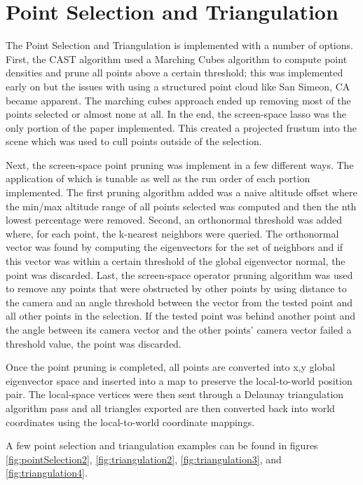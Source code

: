 \section{Point Selection and Triangulation}

The Point Selection and Triangulation is implemented with a number of options.
First, the CAST algorithm used a Marching Cubes algorithm to compute point
densities and prune all points above a certain threshold; this was implemented
early on but the issues with using a structured point cloud like San Simeon, CA
became apparent. The marching cubes approach ended up removing most of the
points selected or almost none at all. In the end, the screen-space lasso was
the only portion of the paper implemented. This created a projected frustum into
the scene which was used to cull points outside of the selection.

Next, the screen-space point pruning was implement in a few different ways. The
application of which is tunable as well as the run order of each portion
implemented. The first pruning algorithm added was a naive altitude offset where
the min/max altitude range of all points selected was computed and then the nth
lowest percentage were removed. Second, an orthonormal threshold was added
where, for each point, the k-nearest neighbors were queried. The orthonormal
vector was found by computing the eigenvectors for the set of neighbors and if
this vector was within a certain threshold of the global eigenvector normal, the
point was discarded. Last, the screen-space operator pruning algorithm was used
to remove any points that were obstructed by other points by using distance to
the camera and an angle threshold between the vector from the tested point and
all other points in the selection. If the tested point was behind another point
and the angle between its camera vector and the other points’ camera vector
failed a threshold value, the point was discarded.

Once the point pruning is completed, all points are converted into x,y global
eigenvector space and inserted into a map to preserve the local-to-world
position pair. The local-space vertices were then sent through a Delaunay
triangulation algorithm pass and all triangles exported are then converted back
into world coordinates using the local-to-world coordinate mappings.

A few point selection and triangulation examples can be found in figures
\ref{fig:pointSelection2}, \ref{fig:triangulation2}, \ref{fig:triangulation3},
and \ref{fig:triangulation4}.

